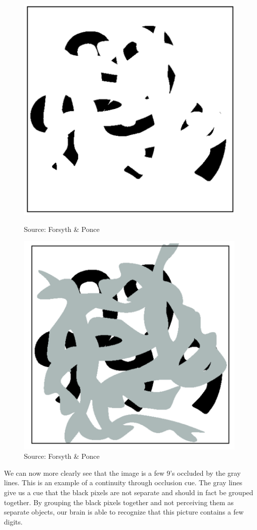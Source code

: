 \documentclass{article}
\begin{document}
\begin{figure}[!htb]
	\begin{minipage}{0.48\textwidth}
		\centering
		\includegraphics[width=.7\linewidth]{continuity-occlusion.png}
		\caption{Source: Forsyth \& Ponce \cite{forsyth2011computer}}
	\end{minipage}\hfill
	\begin {minipage}{0.48\textwidth}
	\centering
	\includegraphics[width=.7\linewidth]{continuity-occlusion-2.png}
	\caption{Source: Forsyth \& Ponce \cite{forsyth2011computer}}
\end{minipage}
\end{figure}


We can now more clearly see that the image is a few 9's occluded by the gray lines. This is an example of a continuity through occlusion cue. The gray lines give us a cue that the black pixels are not separate and should in fact be grouped together. By grouping the black pixels together and not perceiving them as separate objects, our brain is able to recognize that this picture contains a few digits.
\end{document}
